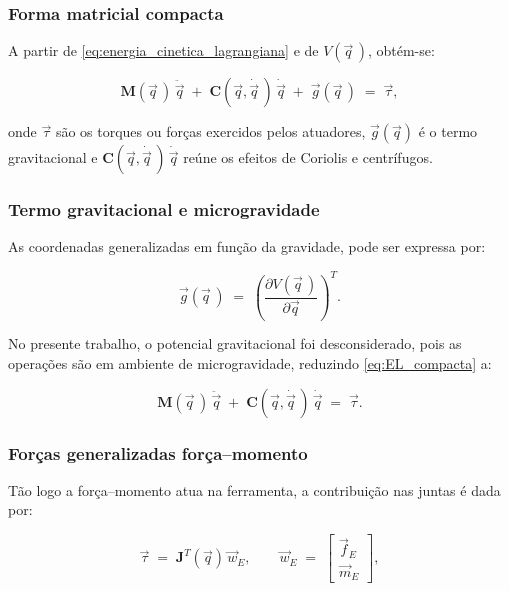 \subsubsection{Forma matricial compacta}
A partir de \eqref{eq:energia_cinetica_lagrangiana} e de $V(\vec q\, )$, obtém-se:

\begin{equation}
\label{eq:EL_compacta}
\mathbf M(\vec q\,)\,\ddot{\vec q} \;+\; \mathbf C(\vec q,\dot{\vec q}\,)\,\dot{\vec q} \;+\; \vec g(\vec q\,)
\;=\;
\vec \tau,
\end{equation}

onde $\vec\tau$ são os torques ou forças exercidos pelos atuadores,
$\vec g(\vec q)$ é o termo gravitacional e
$\mathbf C(\vec q,\dot{\vec q}\,)\,\dot{\vec q}$ reúne os efeitos de Coriolis e centrífugos.

\subsubsection{Termo gravitacional e microgravidade}
As coordenadas generalizadas em função da gravidade, pode ser expressa por:

\begin{equation}
\vec g(\vec q\,)
\;=\;
\left(\frac{\partial V(\vec q\,)}{\partial \vec q}\right)^T.
\label{eq:g_def}
\end{equation}

No presente trabalho, o potencial gravitacional foi desconsiderado, pois as operações são em ambiente de microgravidade, reduzindo \eqref{eq:EL_compacta} a:

\begin{equation}
\label{eq:EL_microgravidade}
\mathbf M(\vec q\,)\,\ddot{\vec q}
\;+\;
\mathbf C(\vec q,\dot{\vec q}\,)\,\dot{\vec q}
\;=\;
\vec \tau.
\end{equation}

\subsubsection{Forças generalizadas força--momento}
Tão logo a força--momento atua na ferramenta, a contribuição nas juntas é dada por:

\begin{equation}
\label{eq:tau_Jt_w}
\vec \tau
\;=\;
\mathbf J^{T}(\vec q)\,\vec w_{E}, 
\qquad
\vec w_{E} \;=\; \begin{bmatrix}\vec f_{E} \\ \vec m_{E}\end{bmatrix},
\end{equation}


